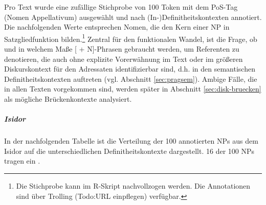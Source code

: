 Pro Text wurde eine zufällige Stichprobe von 100 Token mit dem PoS-Tag  (Nomen Appellativum) ausgewählt und nach (In-)Definitheitskontexten annotiert. Die nachfolgenden Werte entsprechen Nomen, die den Kern einer NP in Satzgliedfunktion bilden.\footnote{Die Stichprobe kann im R-Skript  nachvollzogen werden. Die Annotationen sind über Trolling (Todo:URL einpflegen) verfügbar.}   
Zentral für den funktionalen Wandel, ist die Frage, ob und in welchem Maße
[ + N]-Phrasen gebraucht werden, um Referenten zu denotieren, die auch ohne explizite Vorerwähnung im Text oder im größeren Diskurskontext für den Adressaten identifizierbar sind, d.h. in den semantischen Definitheitskontexten auftreten (vgl. Abschnitt \ref{sec:pragsem}). Ambige Fälle, die in allen Texten vorgekommen sind, werden später in Abschnitt \ref{sec:disk-bruecken} als mögliche Brückenkontexte analysiert. 

\subparagraph*{Isidor} 

In der nachfolgenden Tabelle ist die Verteilung der 
100 annotierten NPs aus dem Isidor auf die unterschiedlichen Definitheitskontexte dargestellt. 16 der 100 NPs tragen ein .


